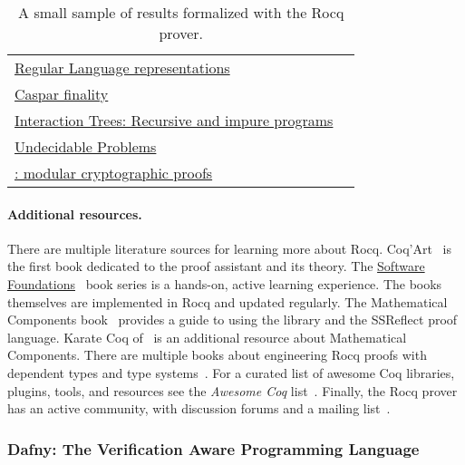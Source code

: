 \begin{table}
\begin{NiceTabularX}{\textwidth}{@{}l@{ }X@{}}
   \href{https://github.com/rocq-community/reglang}%
   {Regular Language representations}
   & \textcite{doczkal2018}
   \\
   \href{https://github.com/runtimeverification/casper-proofs/tree/master}
   {Caspar  finality}
   & \textcite{palmskog2018}
   \\
   \href{https://github.com/DeepSpec/InteractionTrees}%
   {Interaction Trees: Recursive and impure programs}
   & \textcite{xia2019}
   \\
   \href{https://github.com/uds-psl/coq-library-undecidability}%
   {Undecidable Problems}
   & \textcite{forster2020b}
   \\
   \href{https://github.com/SSProve/ssprove}%
   {: modular cryptographic proofs}
   & \textcite{haselwarter2023}
   \\
   \bottomrule
\end{NiceTabularX}
\caption[The Rocq prover formalization results]
{A small sample of results formalized with the Rocq prover.}
\label{tab:rocq-results}
\end{table}

\paragraph*{Additional resources.}
There are multiple literature sources for learning more about Rocq.
Coq'Art~\cite{bertot2004} is the first book dedicated to the proof assistant and its theory.
The \href{https://softwarefoundations.cis.upenn.edu}{Software Foundations}~\cite{cpierce20221}
book series is a hands-on, active learning experience.
The books themselves are implemented in Rocq and updated regularly.
The Mathematical Components book~\cite{mahboubi2022} provides a guide to using the library and the SSReflect proof language.
Karate Coq of~\textcite{affeldt2023} is an additional resource about Mathematical Components.
There are multiple books about engineering Rocq proofs with dependent types and type systems~\cite{chlipala2022,chlipala2013,sergey2014,smolka2021}.
For a curated list of awesome Coq libraries, plugins, tools, and resources see the
\emph{Awesome Coq} list~\cite{awesome-coq}.
Finally, the Rocq prover has an active community, with discussion forums and a mailing list~\cite{rocq-community}.

\subsubsection{Dafny: The Verification Aware Programming Language}
\label{subsec:dafny}

